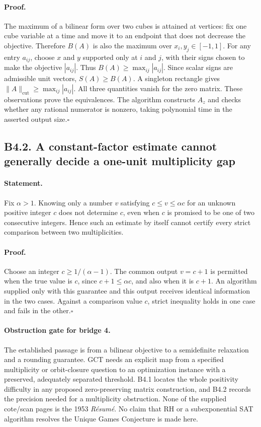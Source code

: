 \paragraph{Proof.}
The maximum of a bilinear form over two cubes is attained at vertices:
fix one cube variable at a time and move it to an endpoint that does not
decrease the objective.  Therefore $B(A)$ is also the maximum over
$x_i,y_j\in[-1,1]$.  For any entry $a_{ij}$, choose $x$ and $y$ supported
only at $i$ and $j$, with their signs chosen to make the objective
$|a_{ij}|$.  Thus $B(A)\geq\max_{ij}|a_{ij}|$.
Since scalar signs are admissible unit vectors, $S(A)\geq B(A)$.
A singleton rectangle gives
$\|A\|_{\mathrm{cut}}\geq\max_{ij}|a_{ij}|$.
All three quantities vanish for the zero matrix.  These observations
prove the equivalences.  The algorithm constructs $A_z$ and checks
whether any rational numerator is nonzero, taking polynomial time in
the asserted output size.\hfill$\square$

\subsection*{B4.2. A constant-factor estimate cannot generally decide a one-unit multiplicity gap}
\paragraph{Statement.}
Fix $\alpha>1$.  Knowing only a number $v$ satisfying
$c\leq v\leq\alpha c$ for an unknown positive integer $c$ does not
determine $c$, even when $c$ is promised to be one of two consecutive
integers.  Hence such an estimate by itself cannot certify every strict
comparison between two multiplicities.
\paragraph{Proof.}
Choose an integer $c\geq1/(\alpha-1)$.  The common output $v=c+1$
is permitted when the true value is $c$, since
$c+1\leq\alpha c$, and also when it is $c+1$.  An algorithm supplied
only with this guarantee and this output receives identical information
in the two cases.  Against a comparison value $c$, strict inequality
holds in one case and fails in the other.\hfill$\square$

\paragraph{Obstruction gate for bridge 4.}
The established passage is from a bilinear objective to a semidefinite
relaxation and a rounding guarantee.  GCT needs an explicit map from a
specified multiplicity or orbit-closure question to an optimization
instance with a preserved, adequately separated threshold.  B4.1 locates
the whole positivity difficulty in any proposed zero-preserving
matrix construction, and B4.2 records the precision needed for a
multiplicity obstruction.  None of the supplied cote/scan pages is the
1953 \emph{R\'esum\'e}.  No claim that RH or a subexponential SAT
algorithm resolves the Unique Games Conjecture is made here.

